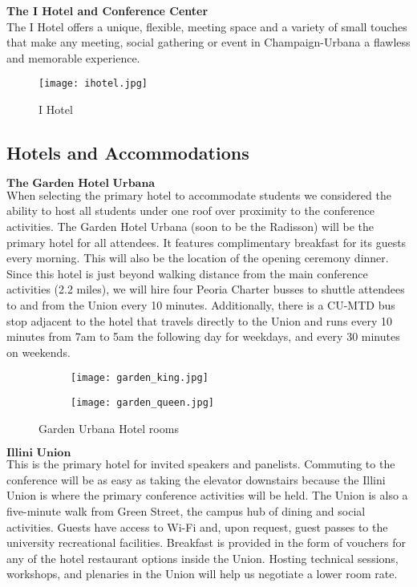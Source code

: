 \textbf{The I Hotel and Conference Center}\\
The I Hotel offers a unique, flexible, meeting space and a variety of small touches that make any meeting, social gathering or event in Champaign-Urbana a flawless and memorable experience.\\

\begin{figure}[H]
    \centering
    \texttt{[image: ihotel.jpg]}
    \caption{I Hotel}
    \label{fig:beckman}
\end{figure}

\newpage
\subsection{Hotels and Accommodations}

$\textbf{The Garden Hotel Urbana}$\\
When selecting the primary hotel to accommodate students we considered the ability to host all students under one roof over proximity to the conference activities. The Garden Hotel Urbana (soon to be the Radisson) will be the primary hotel for all attendees. It features complimentary breakfast for its guests every morning. This will also be the location of the opening ceremony dinner. Since this hotel is just beyond walking distance from the main conference activities (2.2 miles), we will hire four Peoria Charter busses to shuttle attendees to and from the Union every 10 minutes. Additionally, there is a CU-MTD bus stop adjacent to the hotel that travels directly to the Union and runs every 10 minutes from 7am to 5am the following day for weekdays, and every 30 minutes on weekends.\\ 
\begin{figure}[H]
	\centering
	\begin{subfigure}{0.5\textwidth}
		\centering
		\texttt{[image: garden\_king.jpg]}
	\end{subfigure}%
	\begin{subfigure}{0.5\textwidth}
		\centering
		\texttt{[image: garden\_queen.jpg]}
	\end{subfigure}
	\caption{Garden Urbana Hotel rooms}		
\end{figure} 

$\textbf{Illini Union}$\\
This is the primary hotel for invited speakers and panelists. Commuting to the conference will be as easy as taking the elevator downstairs because the Illini Union is where the primary conference activities will be held. The Union is also a five-minute walk from Green Street, the campus hub of dining and social activities. Guests have access to Wi-Fi and, upon request, guest passes to the university recreational facilities. Breakfast is provided in the form of vouchers for any of the hotel restaurant options inside the Union. Hosting technical sessions, workshops, and plenaries in the Union will help us negotiate a lower room rate.\\

